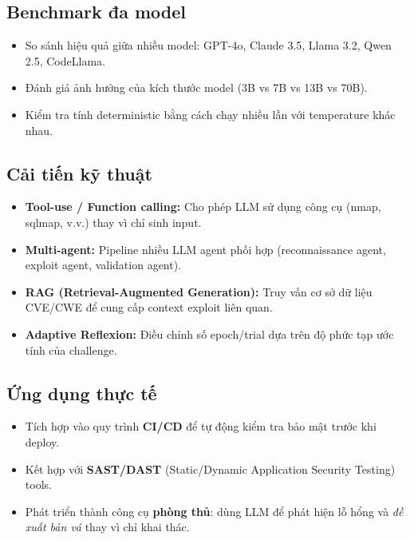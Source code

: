 \documentclass{nt521report}
\begin{document}
\subsection{Benchmark đa model}

\begin{itemize}
  \item So sánh hiệu quả giữa nhiều model: GPT-4o, Claude 3.5, Llama 3.2, Qwen 2.5, CodeLlama.
  \item Đánh giá ảnh hưởng của kích thước model (3B vs 7B vs 13B vs 70B).
  \item Kiểm tra tính deterministic bằng cách chạy nhiều lần với temperature khác nhau.
\end{itemize}

\subsection{Cải tiến kỹ thuật}

\begin{itemize}
  \item \textbf{Tool-use / Function calling:} Cho phép LLM sử dụng công cụ (nmap, sqlmap, v.v.) thay vì chỉ sinh input.
  \item \textbf{Multi-agent:} Pipeline nhiều LLM agent phối hợp (reconnaissance agent, exploit agent, validation agent).
  \item \textbf{RAG (Retrieval-Augmented Generation):} Truy vấn cơ sở dữ liệu CVE/CWE để cung cấp context exploit liên quan.
  \item \textbf{Adaptive Reflexion:} Điều chỉnh số epoch/trial dựa trên độ phức tạp ước tính của challenge.
\end{itemize}

\subsection{Ứng dụng thực tế}

\begin{itemize}
  \item Tích hợp vào quy trình \textbf{CI/CD} để tự động kiểm tra bảo mật trước khi deploy.
  \item Kết hợp với \textbf{SAST/DAST} (Static/Dynamic Application Security Testing) tools.
  \item Phát triển thành công cụ \textbf{phòng thủ}: dùng LLM để phát hiện lỗ hổng và \textit{đề xuất bản vá} thay vì chỉ khai thác.
\end{itemize}
\end{document}
